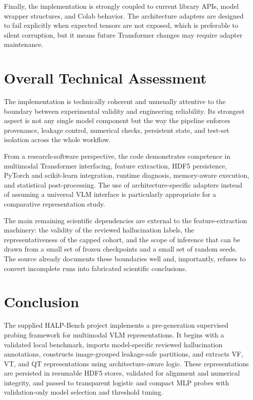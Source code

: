 \documentclass[11pt,a4paper]{article}
\begin{document}
Finally, the implementation is strongly coupled to current library APIs, model wrapper structures, and Colab behavior. The architecture adapters are designed to fail explicitly when expected tensors are not exposed, which is preferable to silent corruption, but it means future Transformer changes may require adapter maintenance.

\section{Overall Technical Assessment}

The implementation is technically coherent and unusually attentive to the boundary between experimental validity and engineering reliability. Its strongest aspect is not any single model component but the way the pipeline enforces provenance, leakage control, numerical checks, persistent state, and test-set isolation across the whole workflow.

From a research-software perspective, the code demonstrates competence in multimodal Transformer interfacing, feature extraction, HDF5 persistence, PyTorch and scikit-learn integration, runtime diagnosis, memory-aware execution, and statistical post-processing. The use of architecture-specific adapters instead of assuming a universal VLM interface is particularly appropriate for a comparative representation study.

The main remaining scientific dependencies are external to the feature-extraction machinery: the validity of the reviewed hallucination labels, the representativeness of the capped cohort, and the scope of inference that can be drawn from a small set of frozen checkpoints and a small set of random seeds. The source already documents these boundaries well and, importantly, refuses to convert incomplete runs into fabricated scientific conclusions.

\section{Conclusion}

The supplied HALP-Bench project implements a pre-generation supervised probing framework for multimodal VLM representations. It begins with a validated local benchmark, imports model-specific reviewed hallucination annotations, constructs image-grouped leakage-safe partitions, and extracts VF, VT, and QT representations using architecture-aware logic. These representations are persisted in resumable HDF5 stores, validated for alignment and numerical integrity, and passed to transparent logistic and compact MLP probes with validation-only model selection and threshold tuning.
\end{document}
